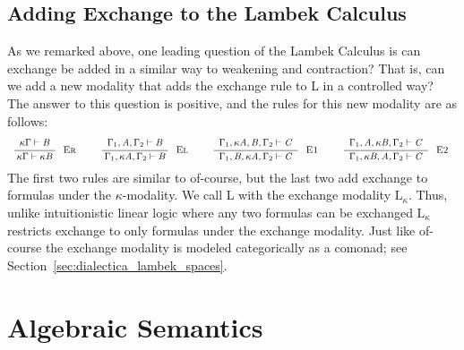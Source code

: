 \documentclass{llncs}
\newcommand{\LE}{\text{L}_\kappa}
\begin{document}
\subsection{Adding Exchange to the Lambek Calculus}
\label{subsec:the_lambek_calculus_with_the_exchange_modality}
As we remarked above, one leading question of the Lambek Calculus is
can exchange be added in a similar way to weakening and contraction?
That is, can we add a new modality that adds the exchange rule to L in
a controlled way?  The answer to this question is positive, and the
rules for this new modality are as follows:
\[
\small
\begin{array}{ccccccccccccccccccccc}  
  \LdruleEr{} & & \LdruleEl{} & & \LdruleEOne{} & & \LdruleETwo{} 
\end{array}
\]
The first two rules are similar to of-course, but the last two add
exchange to formulas under the $\kappa$-modality.  We call L with the
exchange modality $\LE$.  Thus, unlike intuitionistic linear logic
where any two formulas can be exchanged $\LE$ restricts exchange to
only formulas under the exchange modality.  Just like of-course
the exchange modality is modeled categorically as a comonad; see
Section~\ref{sec:dialectica_lambek_spaces}.

\section{Algebraic Semantics}
\end{document}
